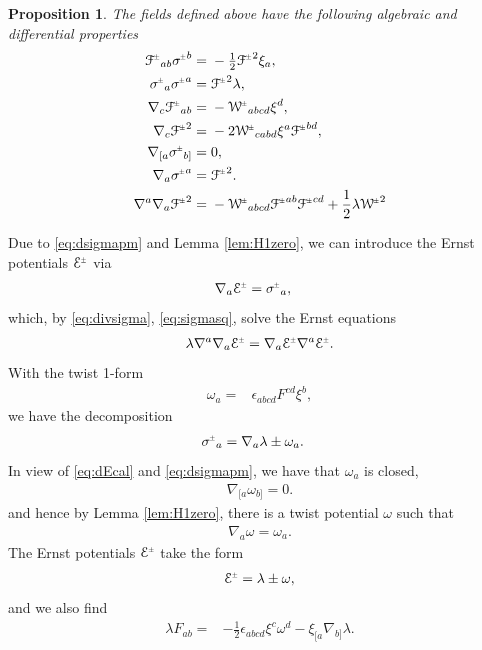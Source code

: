 \documentclass[a4paper,11pt,reqno]{amsart}
\newcommand{\cE}{\mathcal{E}}
\theoremstyle{plain}
\newtheorem{prop}[thm]{Proposition}
\newcommand{\PM}[1]{{{#1}^{\hspace{-.5pt}\scaleto{\pm}{3.5pt}}}}
\def\Wcal{\mathcal{W}}
\def\Fcal{\mathcal{F}}
\def\Ecal{\mathcal{E}}
\numberwithin{equation}{section}
\begin{document}
\begin{prop}  \label{prop:xi-id} 
The fields defined above have the following algebraic and differential properties
\begin{subequations} \label{eq:xi-id}
\begin{align}
%
%
\PM{\Fcal}_{ab} \PM{\sigma}^{b}={}&- \tfrac{1}{2} \PM{\Fcal}^2\xi_{a}, \label{eq:Fsigma} \\
\PM{\sigma}_{a} \PM{\sigma}^{a}={}& \PM{\Fcal}^2 \lambda, \label{eq:sigmasq}\\
\nabla_{c}\PM{\Fcal}_{ab}={}&- \PM{\Wcal}_{abcd} \xi^{d}, \label{eq:nablaFcal} \\
\nabla_{c}\PM{\Fcal}^2={}&-2  \PM{\Wcal}_{cabd} \xi^{a}\PM{\Fcal}^{bd}, \label{eq:nablaFsq}\\
\nabla_{[a}\PM{\sigma}_{b]} ={}& 0, \label{eq:dsigmapm} \\
\nabla_{a}\PM{\sigma}^{a}={}&\PM{\Fcal}^2. \label{eq:divsigma} \\
\nabla^a \nabla_a \PM{\Fcal}^2
={}& 
- \PM{\Wcal}_{abcd} \PM{\Fcal}^{ab} \PM{\Fcal}^{cd}
+ \frac{1}{2} \lambda  \PM{\Wcal}^2\label{eq:laplaceFsq}
\end{align}
\end{subequations}
\end{prop}

Due to \eqref{eq:dsigmapm} and Lemma \ref{lem:H1zero}, 
we can introduce the Ernst potentials $\PM{\Ecal}$ via
\begin{align} \label{eq:Epm}
\nabla_{a}\PM{\Ecal}={}&\PM{\sigma}_{a},
\end{align}
which, by \eqref{eq:divsigma}, \eqref{eq:sigmasq}, solve the Ernst equations
\begin{align}\label{eq:DeltaEcal}
\lambda \nabla^a \nabla_a \PM{\Ecal} = \nabla_a \PM{\Ecal} \nabla^a \PM{\Ecal}.
\end{align}
With the twist 1-form
\begin{align}
\omega_{a}={}&\epsilon_{abcd} F^{cd} \xi^{b},
\end{align}
we have the decomposition
\begin{align} \label{eq:dEcal}
\PM{\sigma}_{a}={}& \nabla_{a}\lambda \pm \omega_{a}.
\end{align}
In view of \eqref{eq:dEcal}  and \eqref{eq:dsigmapm}, we have that $\omega_{a}$ is closed, 
\begin{align} 
\nabla_{[a} \omega_{b]} = 0. 
\end{align} 
and hence by Lemma \ref{lem:H1zero}, there is a  twist potential $\omega$  such that 
\begin{align} 
\nabla_a \omega = \omega_a. 
\end{align} 
The Ernst potentials $\PM{\cE}$ take the form
\begin{align} \label{eq:Ecal-lam-om} 
\PM{\Ecal} = \lambda \pm \omega,
\end{align}
and we also find  
\begin{align}
\lambda F_{ab} ={}&- \tfrac{1}{2} \epsilon_{abcd} \xi^{c} \omega^{d}
-\xi_{[a}\nabla_{b]}\lambda .
\end{align}
%
\end{document}
